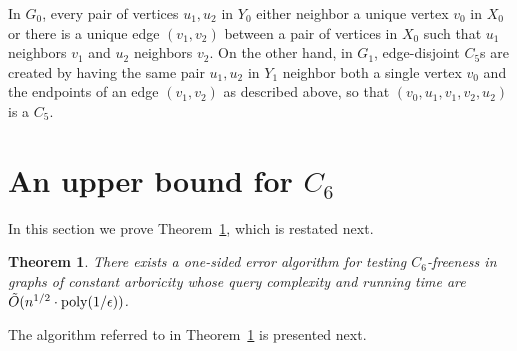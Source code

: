 \documentclass{article}
\newcommand{\eps}{\epsilon}
\newcommand{\poly}{\textrm{poly}}
\newtheorem{theorem}{Theorem}
\newcommand{\commentt}[1]{ {}}
\begin{document}
In $G_0$, every pair of vertices $u_1,u_2$ in $Y_0$ either neighbor a unique vertex $v_0$ in $X_0$ or there is a unique edge $(v_1,v_2)$ between a pair of vertices in $X_0$ such that $u_1$ neighbors $v_1$ and $u_2$ neighbors $v_2$.
On the other hand, in $G_1$, edge-disjoint $C_5$s are created by having the same pair $u_1,u_2$ in $Y_1$ neighbor both a single vertex $v_0$ and the endpoints of an edge $(v_1,v_2)$ as described above, so that $(v_0,u_1,v_1,v_2,u_2)$ is a $C_5$.




\section{An upper bound for $C_6$}\label{sec:C6-ub}
In this section we prove Theorem~\ref{thm:C6-ub}, which is restated next.

\begin{theorem}\label{thm:C6-ub}
There exists a one-sided error algorithm for testing $C_6$-freeness in graphs of constant arboricity  whose query complexity and running time are $\tilde{O}(n^{1/2}\cdot {\rm poly}(1/\eps))$.
\end{theorem}

The algorithm referred to in Theorem~\ref{thm:C6-ub} is presented next.
\end{document}
